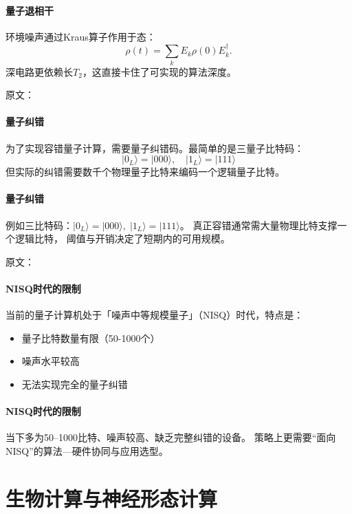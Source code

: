 \paragraph{量子退相干}
环境噪声通过Kraus算子作用于态：
$$\rho(t)=\sum_k E_k\rho(0)E_k^\dagger.$$
深电路更依赖长$T_2$，这直接卡住了可实现的算法深度。

原文：
\paragraph{量子纠错}
为了实现容错量子计算，需要量子纠错码。最简单的是三量子比特码：
$$|0_L\rangle = |000\rangle, \quad |1_L\rangle = |111\rangle$$
但实际的纠错需要数千个物理量子比特来编码一个逻辑量子比特。
\paragraph{量子纠错}
例如三比特码：$|0_L\rangle=|000\rangle,\;|1_L\rangle=|111\rangle$。  
真正容错通常需大量物理比特支撑一个逻辑比特，  
阈值与开销决定了短期内的可用规模。

原文：
\paragraph{NISQ时代的限制}
当前的量子计算机处于「噪声中等规模量子」（NISQ）时代，特点是：
\begin{itemize}
\item 量子比特数量有限（50-1000个）
\item 噪声水平较高
\item 无法实现完全的量子纠错
\end{itemize}
\paragraph{NISQ时代的限制}
当下多为50–1000比特、噪声较高、缺乏完整纠错的设备。  
策略上更需要“面向NISQ”的算法—硬件协同与应用选型。




\section{生物计算与神经形态计算}

